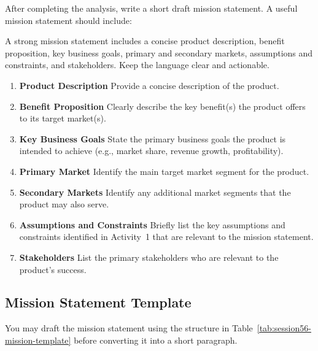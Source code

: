After completing the analysis, write a short draft mission statement. A useful mission statement should include:

\begin{tcolorbox}[title=Hint]
A strong mission statement includes a concise product description, benefit proposition, key business goals, primary and secondary markets, assumptions and constraints, and stakeholders. Keep the language clear and actionable.
\end{tcolorbox}


\begin{enumerate}

\item \textbf{Product Description}  
Provide a concise description of the product.

\item \textbf{Benefit Proposition}  
Clearly describe the key benefit(s) the product offers to its target market(s).

\item \textbf{Key Business Goals}  
State the primary business goals the product is intended to achieve (e.g., market share, revenue growth, profitability).

\item \textbf{Primary Market}  
Identify the main target market segment for the product.

\item \textbf{Secondary Markets}  
Identify any additional market segments that the product may also serve.

\item \textbf{Assumptions and Constraints}  
Briefly list the key assumptions and constraints identified in Activity~1 that are relevant to the mission statement.

\item \textbf{Stakeholders}  
List the primary stakeholders who are relevant to the product’s success.

\end{enumerate}




\subsection{Mission Statement Template}

You may draft the mission statement using the structure in Table~\ref{tab:session56-mission-template} before converting it into a short paragraph.

